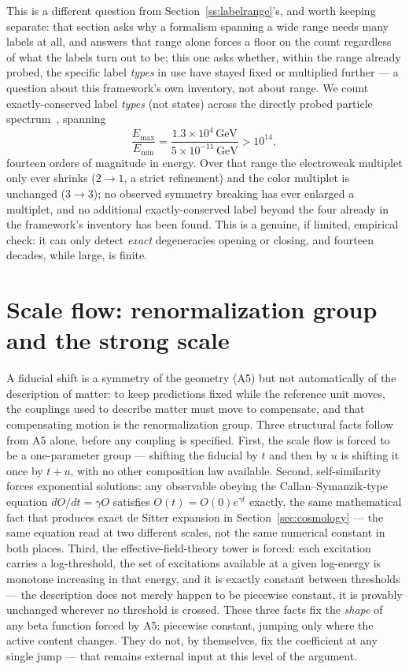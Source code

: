 \documentclass[pdflatex,sn-mathphys-num]{sn-jnl}
\theoremstyle{thmstyleone}
\theoremstyle{thmstylethree}
\theoremstyle{thmstyletwo}
\begin{document}
This is a different question from Section~\ref{ss:labelrange}'s, and
worth keeping separate: that section asks why a formalism spanning a
wide range needs many labels at all, and answers that range alone forces
a floor on the count regardless of what the labels turn out to be; this
one asks whether, within the range already probed, the specific label
\emph{types} in use have stayed fixed or multiplied further — a question
about this framework's own inventory, not about range. We count
exactly-conserved label \emph{types} (not states) across the
directly probed particle spectrum~\cite{PDG2024}, spanning
\begin{equation}
\frac{E_{\max}}{E_{\min}} = \frac{1.3\times10^{4}\,\text{GeV}}{5\times10^{-11}\,\text{GeV}} > 10^{14},
\end{equation}
fourteen orders of magnitude in energy. Over that range the electroweak
multiplet only ever shrinks ($2\to1$, a strict refinement) and the color
multiplet is unchanged ($3\to3$); no observed symmetry breaking has ever
enlarged a multiplet, and no additional exactly-conserved label beyond
the four already in the framework's inventory has been found. This is a
genuine, if limited, empirical check: it can only detect \emph{exact}
degeneracies opening or closing, and fourteen decades, while large, is
finite.

\section{Scale flow: renormalization group and the strong scale}\label{sec:flow}

A fiducial shift is a symmetry of the geometry (A5) but not automatically
of the description of matter: to keep predictions fixed while the
reference unit moves, the couplings used to describe matter must move to
compensate, and that compensating motion is the renormalization group.
Three structural facts follow from A5 alone, before any coupling is
specified. First, the scale flow is forced to be a one-parameter group —
shifting the fiducial by $t$ and then by $u$ is shifting it once by
$t+u$, with no other composition law available. Second, self-similarity
forces exponential solutions: any observable obeying the
Callan–Symanzik-type equation $dO/dt=\gamma O$ satisfies
$O(t)=O(0)e^{\gamma t}$ exactly, the same mathematical fact that produces
exact de Sitter expansion in Section~\ref{sec:cosmology} — the same
equation read at two different scales, not the same numerical constant
in both places. Third, the effective-field-theory tower is forced: each
excitation carries a log-threshold, the set of excitations available at
a given log-energy is monotone increasing in that energy, and it is
exactly constant between thresholds — the description does not merely
happen to be piecewise constant, it is provably unchanged wherever no
threshold is crossed. These three facts fix the \emph{shape} of any beta
function forced by A5: piecewise constant, jumping only where the
active content changes. They do not, by themselves, fix the coefficient
at any single jump — that remains external input at this level of the
argument.
\end{document}
